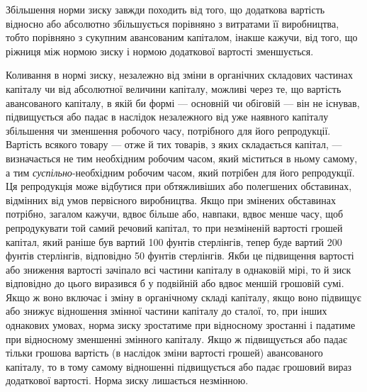 Збільшення норми зиску завжди походить від того, що додаткова
вартість відносно або абсолютно збільшується порівняно
з витратами її виробництва, тобто порівняно з сукупним авансованим
капіталом, інакше кажучи, від того, що ріжниця між
нормою зиску і нормою додаткової вартості зменшується.

Коливання в нормі зиску, незалежно від зміни в органічних
складових частинах капіталу чи від абсолютної величини капіталу,
можливі через те, що вартість авансованого капіталу,
в якій би формі — основній чи обіговій — він не існував,
підвищується або падає в наслідок незалежного від уже наявного
капіталу збільшення чи зменшення робочого часу, потрібного
для його репродукції. Вартість всякого товару — отже
й тих товарів, з яких складається капітал, — визначається не
тим необхідним робочим часом, який міститься в ньому самому,
а тим \emph{суспільно}-необхідним робочим часом, який потрібен для
його репродукції. Ця репродукція може відбутися при обтяжливіших
або полегшених обставинах, відмінних від умов первісного
виробництва. Якщо при змінених обставинах потрібно,
загалом кажучи, вдвоє більше або, навпаки, вдвоє менше часу,
щоб репродукувати той самий речовий капітал, то при незміненій
вартості грошей капітал, який раніше був вартий 100 фунтів
стерлінгів, тепер буде вартий 200 фунтів стерлінгів, відповідно
50 фунтів стерлінгів. Якби це підвищення вартості або
зниження вартості зачіпало всі частини капіталу в однаковій
мірі, то й зиск відповідно до цього виразився б у подвійній
або вдвоє меншій грошовій сумі. Якщо ж воно включає і зміну
в органічному складі капіталу, якщо воно підвищує або знижує
відношення змінної частини капіталу до сталої, то, при інших
однакових умовах, норма зиску зростатиме при відносному
зростанні і падатиме при відносному зменшенні змінного капіталу.
Якщо ж підвищується або падає тільки грошова вартість
(в наслідок зміни вартості грошей) авансованого капіталу, то
в тому самому відношенні підвищується або падає грошовий вираз
додаткової вартості. Норма зиску лишається незмінною.
\parbreak{}  %
